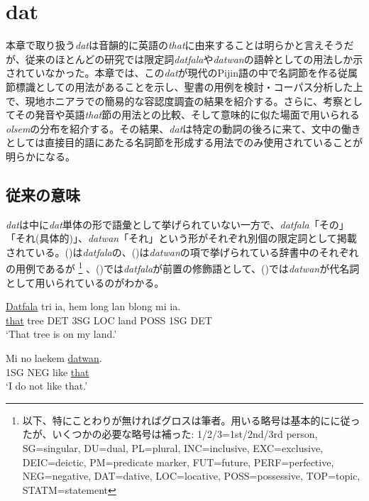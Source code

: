 \chapter{dat}

本章で取り扱う\textit{dat}は音韻的に英語の\textit{that}に由来することは明らかと言えそうだが、従来のほとんどの研究では限定詞\textit{datfala}や\textit{datwan}の語幹としての用法しか示されていなかった。本章では、この\textit{dat}が現代のPijin語の中で名詞節を作る従属節標識としての用法があることを示し、聖書の用例を検討・コーパス分析した上で、現地ホニアラでの簡易的な容認度調査の結果を紹介する。さらに、考察としてその発音や英語\textit{that}節の用法との比較、そして意味的に似た場面で用いられる\textit{olsem}の分布を紹介する。その結果、\textit{dat}は特定の動詞の後ろに来て、文中の働きとしては直接目的語にあたる名詞節を形成する用法でのみ使用されていることが明らかになる。

\section{従来の意味}

\textit{dat}は\cite{dictionary}中に\textit{dat}単体の形で語彙として挙げられていない一方で、\textit{datfala}「その」「それ(具体的)」、\textit{datwan}「それ」という形がそれぞれ別個の限定詞として掲載されている。()は\textit{datfala}の、()は\textit{datwan}の項で挙げられている辞書中のそれぞれの用例であるが
\footnote{以下、特にことわりが無ければグロスは筆者。用いる略号は基本的に\cite{prepositions}に従ったが、いくつかの必要な略号は補った: 1/2/3=1st/2nd/3rd person, SG=singular, DU=dual, PL=plural, INC=inclusive, EXC=exclusive, DEIC=deictic, PM=predicate marker, FUT=future, PERF=perfective, NEG=negative, DAT=dative, LOC=locative, POSS=possessive, TOP=topic, STATM=statement}
、()では\textit{datfala}が前置の修飾語として、()では\textit{datwan}が代名詞として用いられているのがわかる。

\begin{exe}
  \ex
  \gll \underline{Datfala} tri ia, hem long lan blong mi ia.\\
  \underline{that} tree DET 3SG LOC land POSS 1SG DET\\
  \glt `That tree is on my land.' \cite[34]{dictionary}

  \ex
  \gll Mi no laekem \underline{datwan}.\\
  1SG NEG like \underline{that}\\
  \glt `I do not like that.' \cite[34]{dictionary}
\end{exe}

